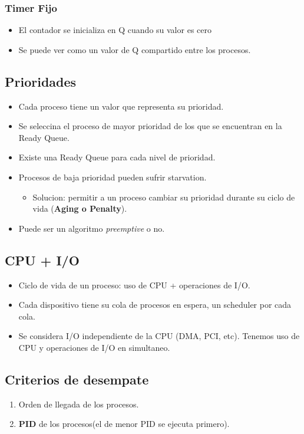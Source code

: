 \documentclass[11pt]{article}
\begin{document}
\subsubsection{Timer Fijo}
\begin{itemize}
    \item El contador se inicializa en Q cuando su valor es cero
    \item Se puede ver como un valor de Q compartido entre los procesos.
\end{itemize}

\subsection{Prioridades}
\begin{itemize}
    \item Cada proceso tiene un valor que representa su prioridad.
    \item Se seleccina el proceso de mayor prioridad de los que se encuentran en la Ready Queue.
    \item Existe una Ready Queue para cada nivel de prioridad.
    \item Procesos de baja prioridad pueden sufrir starvation.
        \begin{itemize}
            \item Solucion: permitir a un proceso cambiar su prioridad durante su ciclo de vida (\textbf{Aging o Penalty}).
        \end{itemize}
    \item Puede ser un algoritmo \textit{preemptive} o no.
\end{itemize}


\subsection{CPU + I/O}
\begin{itemize}
    \item Ciclo de vida de un proceso: uso de CPU + operaciones de I/O.
    \item Cada dispositivo tiene su cola de procesos en espera, un scheduler por cada cola.
    \item Se considera I/O independiente de la CPU (DMA, PCI, etc). Tenemos uso de CPU y operaciones de I/O en simultaneo.
\end{itemize}

\subsection{Criterios de desempate}
\begin{enumerate}
    \item Orden de llegada de los procesos.
    \item \textbf{PID} de los procesos(el de menor PID se ejecuta primero).
\end{enumerate}
\end{document}
